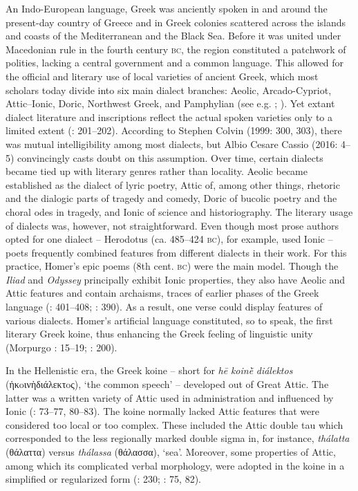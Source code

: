 An Indo-European language, Greek was anciently spoken in and around the present-day country of Greece and in Greek colonies scattered across the islands and coasts of the Mediterranean and the Black Sea. Before it was united under Macedonian rule in the fourth century \textsc{bc}, the region constituted a patchwork of polities, lacking a central government and a common language. This allowed for the official and literary use of local varieties of ancient Greek, which most scholars today divide into six main dialect branches: Aeolic, Arcado-Cypriot, Attic–Ionic, Doric, Northwest Greek, and Pamphylian (see e.g. \citealt{Colvin2010}; \citealt{Finkelberg2014}). Yet extant dialect literature and inscriptions reflect the actual spoken varieties only to a limited extent (\citealt{Colvin2010}: 201–202). According to Stephen Colvin (1999: 300, 303), there was mutual intelligibility among most dialects, but Albio Cesare Cassio (2016: 4–5) convincingly casts doubt on this assumption. Over time, certain dialects became tied up with literary genres rather than locality. Aeolic became established as the dialect of lyric poetry, Attic of, among other things, rhetoric and the dialogic parts of tragedy and comedy, Doric of bucolic poetry and the choral odes in tragedy, and Ionic of science and historiography. The literary usage of dialects was, however, not straightforward. Even though most prose authors opted for one dialect – Herodotus (ca. 485–424 \textsc{bc}), for example, used Ionic – poets frequently combined features from different dialects in their work. For this practice, Homer’s epic poems (8th cent. \textsc{bc}) were the main model. Though the \textit{Iliad} and \textit{Odyssey} principally exhibit Ionic properties, they also have Aeolic and Attic features and contain archaisms, traces of earlier phases of the Greek language (\citealt{Hackstein2010}: 401–408; \citealt{Tribulato2010}: 390). As a result, one verse could display features of various dialects. Homer’s artificial language constituted, so to speak, the first literary Greek koine, thus enhancing the Greek feeling of linguistic unity (Morpurgo \citealt{Davies1987}: 15–19; \citealt{Colvin2010}: 200).

In the Hellenistic era, the Greek koine – short for \textit{hē} \textit{koinḕ} \textit{diálektos} (ἡκoινὴδιάλεκτoς), ‘the common speech’ – developed out of Great Attic. The latter was a written variety of Attic used in administration and influenced by Ionic (\citealt{Horrocks2010}: 73–77, 80–83). The koine normally lacked Attic features that were considered too local or too complex. These included the Attic double tau which corresponded to the less regionally marked double sigma in, for instance, \textit{thálatta} (θάλαττα) versus \textit{thálassa} (θάλασσα), ‘sea’. Moreover, some properties of Attic, among which its complicated verbal morphology, were adopted in the koine in a simplified or regularized form (\citealt{Brixhe2010}: 230; \citealt{Horrocks2010}: 75, 82).

